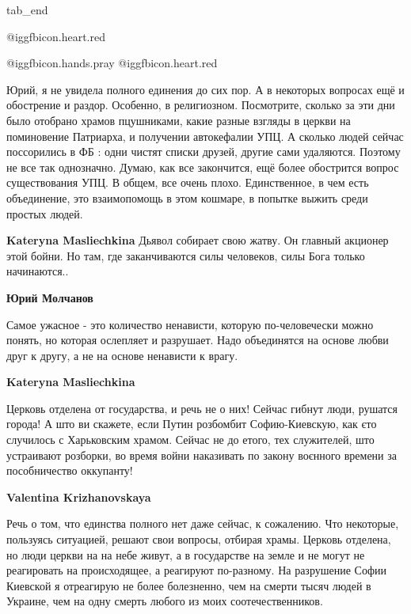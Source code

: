 \begin{itemize}
  tab_end
\fi

@igg{fbicon.heart.red}

 @igg{fbicon.hands.pray} @igg{fbicon.heart.red}


Юрий, я не увидела полного единения до сих пор. А в некоторых вопросах ещё и
обострение и раздор. Особенно, в религиозном. Посмотрите, сколько за эти дни
было отобрано храмов пцушниками, какие разные взгляды в церкви на поминовение
Патриарха, и получении автокефалии УПЦ. А сколько людей сейчас поссорились в ФБ
: одни чистят списки друзей, другие сами удаляются. Поэтому не все так
однозначно. Думаю, как все закончится, ещё более обострится вопрос
существования УПЦ. В общем, все очень плохо. Единственное, в чем есть
объединение, это взаимопомощь в этом кошмаре, в попытке выжить среди простых
людей.

\begin{itemize} %
\textbf{Kateryna Masliechkina} Дьявол собирает свою жатву. Он главный акционер этой бойни. Но там, где заканчиваются силы человеков, силы Бога только начинаются..

\textbf{Юрий Молчанов} 

Самое ужасное - это количество ненависти, которую по-человечески можно понять,
но которая ослепляет и разрушает. Надо объединятся на основе любви друг к
другу, а не на основе ненависти к врагу.


\textbf{Kateryna Masliechkina} 

Церковь отделена от государства, и речь не о них! Сейчас гибнут люди, рушатся
города! А што ви скажете, если Путин розбомбит Софию-Киевскую, как єто случилось
с Харьковским храмом. Сейчас не до етого, тех служителей, што устраивают
розборки, во время войни наказивать по закону воєнного времени за пособничество
оккупанту!

\textbf{Valentina Krizhanovskaya} 

Речь о том, что единства полного нет даже сейчас, к сожалению. Что некоторые,
пользуясь ситуацией, решают свои вопросы, отбирая храмы. Церковь отделена, но
люди церкви на на небе живут, а в государстве на земле и не могут не
реагировать на происходящее, а реагируют по-разному. На разрушение Софии
Киевской я отреагирую не более болезненно, чем на смерти тысяч людей в Украине,
чем на одну смерть любого из моих соотечественников.


\end{itemize}
\end{itemize}
